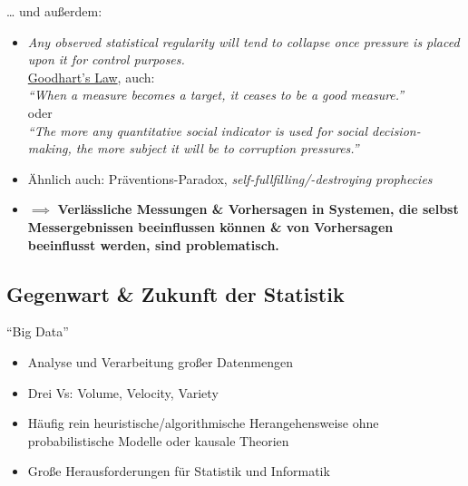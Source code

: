 \documentclass[
  10pt,
  ignorenonframetext,
]{beamer}
\providecommand{\tightlist}{%
  \setlength{\itemsep}{0pt}\setlength{\parskip}{0pt}}
\begin{document}
\begin{frame}{\ldots{} und außerdem:}
\label{und-auuxdferdem}
\begin{itemize}[<+->]
\tightlist
\item
  \emph{Any observed statistical regularity will tend to collapse once
  pressure is placed upon it for control purposes.}\\
  \href{https://en.wikipedia.org/wiki/Goodhart's_law}{Goodhart's Law},
  auch:\\
  \emph{``When a measure becomes a target, it ceases to be a good
  measure.''}\\
  oder\\
  \emph{``The more any quantitative social indicator is used for social
  decision-making, the more subject it will be to corruption
  pressures.''}
\end{itemize}

\begin{itemize}
\tightlist
\item
  Ähnlich auch: Präventions-Paradox, \emph{self-fullfilling/-destroying
  prophecies}
\end{itemize}

\begin{itemize}[<+->]
\tightlist
\item
  \(\implies\) \textbf{Verlässliche Messungen \& Vorhersagen in
  Systemen, die selbst Messergebnissen beeinflussen können \& von
  Vorhersagen beeinflusst werden, sind problematisch.}
\end{itemize}
\end{frame}

\subsection{Gegenwart \& Zukunft der
Statistik}\label{gegenwart-zukunft-der-statistik}

\begin{frame}{``Big Data''}
\label{big-data}
\begin{itemize}
\tightlist
\item
  Analyse und Verarbeitung großer Datenmengen
\item
  Drei Vs: Volume, Velocity, Variety
\item
  Häufig rein heuristische/algorithmische Herangehensweise ohne
  probabilistische Modelle oder kausale Theorien
\item
  Große Herausforderungen für Statistik und Informatik
\end{itemize}
\end{frame}
\end{document}
